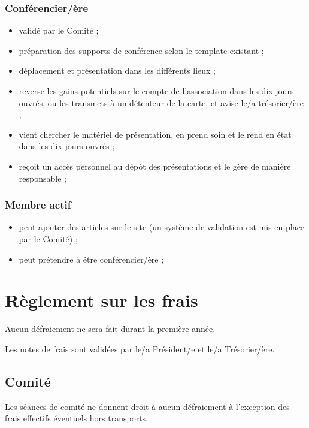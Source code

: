 \documentclass[12pt,twoside]{report}
\begin{document}
\subsubsection*{Conférencier/ère}
\begin{itemize}
\item validé par le Comité ;
\item préparation des supports de conférence selon le template existant ;
\item déplacement et présentation dans les différents lieux ;
\item reverse les gains potentiels sur le compte de l’association dans les dix jours ouvrés, ou les transmets à un détenteur de la carte, et avise le/a trésorier/ère ;
\item vient chercher le matériel de présentation, en prend soin et le rend en état dans les dix jours ouvrés ;
\item reçoit un accès personnel au dépôt des présentations et le gère de manière responsable ;
\end{itemize}

\subsubsection*{Membre actif}
\begin{itemize}
\item peut ajouter des articles sur le site (un système de validation est mis en place par le Comité) ;
\item peut prétendre à être conférencier/ère ;
\end{itemize}

\section*{Règlement sur les frais}

Aucun défraiement ne sera fait durant la première année.

Les notes de frais sont validées par le/a Président/e et le/a Trésorier/ère.

\subsection*{Comité}

Les séances de comité ne donnent droit à aucun défraiement à l’exception des frais effectifs éventuels hors transports.
\end{document}
